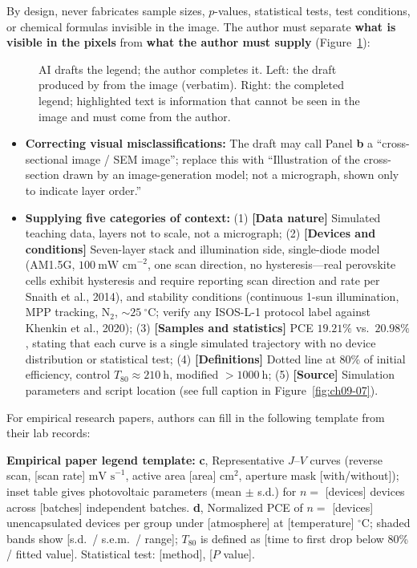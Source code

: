By design,  never fabricates sample sizes, $p$-values, statistical tests, test conditions, or chemical formulas invisible in the image. The author must separate \textbf{what is visible in the pixels} from \textbf{what the author must supply} (Figure~\ref{fig:ch09-08}):

\begin{figure}[htbp]\centering
\resizebox{\linewidth}{!}{}
\caption{AI drafts the legend; the author completes it. Left: the draft produced by  from the image (verbatim). Right: the completed legend; highlighted text is information that cannot be seen in the image and must come from the author.}\label{fig:ch09-08}
\end{figure}

\begin{itemize}
\item \textbf{Correcting visual misclassifications:} The draft may call Panel \textbf{b} a ``cross-sectional image / SEM image''; replace this with ``Illustration of the cross-section drawn by an image-generation model; not a micrograph, shown only to indicate layer order.''
\item \textbf{Supplying five categories of context:} (1) \textbf{[Data nature]} Simulated teaching data, layers not to scale, not a micrograph; (2) \textbf{[Devices and conditions]} Seven-layer stack and illumination side, single-diode model (AM1.5G, $100\ \text{mW cm}^{-2}$, one scan direction, no hysteresis---real perovskite cells exhibit hysteresis and require reporting scan direction and rate per Snaith et al., 2014), and stability conditions (continuous 1-sun illumination, MPP tracking, $\text{N}_2$, $\sim 25\ ^\circ\text{C}$; verify any ISOS-L-1 protocol label against Khenkin et al., 2020); (3) \textbf{[Samples and statistics]} PCE $19.21\%$ vs.\ $20.98\%$, stating that each curve is a single simulated trajectory with no device distribution or statistical test; (4) \textbf{[Definitions]} Dotted line at 80\% of initial efficiency, control $T_{80} \approx 210\ \text{h}$, modified $> 1000\ \text{h}$; (5) \textbf{[Source]} Simulation parameters and script location (see full caption in Figure~\ref{fig:ch09-07}).
\end{itemize}

For empirical research papers, authors can fill in the following template from their lab records:

\begin{BookNote}
\textbf{Empirical paper legend template:} \textbf{c}, Representative $J\text{--}V$ curves (reverse scan, [scan rate] $\text{mV s}^{-1}$, active area [area] $\text{cm}^2$, aperture mask [with/without]); inset table gives photovoltaic parameters (mean $\pm$ s.d.) for $n =$ [devices] devices across [batches] independent batches. \textbf{d}, Normalized PCE of $n =$ [devices] unencapsulated devices per group under [atmosphere] at [temperature] $^\circ\text{C}$; shaded bands show [s.d.\ / s.e.m.\ / range]; $T_{80}$ is defined as [time to first drop below 80\% / fitted value]. Statistical test: [method], [$P$ value].
\end{BookNote}

